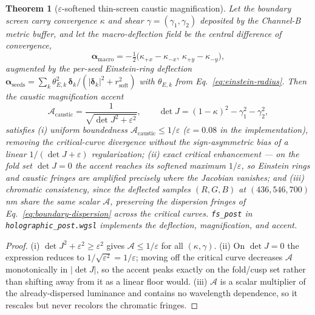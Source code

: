 \documentclass[11pt,letterpaper]{article}
\theoremstyle{plain}
\newtheorem{theorem}{Theorem}
\DeclareRobustCommand{\pyvar}[1]{%
  \ifmmode\text{\nolinkurl{#1}}\else\nolinkurl{#1}\fi%
}
\begin{document}
\begin{theorem}[$\varepsilon$-softened thin-screen caustic magnification]
\label{thm:caustic_eps_soft}
Let the boundary screen carry convergence $\kappa$ and shear
$\gamma=(\gamma_{1},\gamma_{2})$ deposited by the Channel-B metric
buffer, and let the macro-deflection field be the central difference
of convergence,
\begin{equation}
\boldsymbol{\alpha}_{\mathrm{macro}}
  = -\tfrac12\bigl(\kappa_{+x}-\kappa_{-x},\,
                   \kappa_{+y}-\kappa_{-y}\bigr),
\end{equation}
augmented by the per-seed Einstein-ring deflection
$\boldsymbol{\alpha}_{\mathrm{seeds}}
 =\sum_{k}\theta_{E,k}^{2}\,\boldsymbol{\delta}_{k}/
   (|\boldsymbol{\delta}_{k}|^{2}+r_{\mathrm{soft}}^{2})$ with
$\theta_{E,k}$ from Eq.~\eqref{eq:einstein-radius}. Then the caustic
magnification accent
\begin{equation}
\mathcal{A}_{\mathrm{caustic}}
  = \frac{1}{\sqrt{\det J^{2} + \varepsilon^{2}}},
\qquad
\det J = (1-\kappa)^{2} - \gamma_{1}^{2} - \gamma_{2}^{2},
\end{equation}
satisfies (i) uniform boundedness
$\mathcal{A}_{\mathrm{caustic}} \le 1/\varepsilon$
($\varepsilon = 0.08$ in the implementation), removing the
critical-curve divergence without the sign-asymmetric bias of a linear
$1/(\det J+\varepsilon)$ regularization; (ii) exact critical
enhancement --- on the fold set $\det J=0$ the accent reaches its
softened maximum $1/\varepsilon$, so Einstein rings and caustic
fringes are amplified precisely where the Jacobian vanishes; and
(iii) chromatic consistency, since the deflected samples
$(R,G,B)$ at $(436,546,700)$ nm share the same scalar $\mathcal{A}$,
preserving the dispersion fringes of
Eq.~\eqref{eq:boundary-dispersion} across the critical curves.
\pyvar{fs\_post} in \pyvar{holographic\_post.wgsl} implements the
deflection, magnification, and accent.
\end{theorem}

\begin{proof}
(i) $\det J^{2}+\varepsilon^{2}\ge\varepsilon^{2}$ gives
$\mathcal{A}\le1/\varepsilon$ for all $(\kappa,\gamma)$. (ii) On
$\det J=0$ the expression reduces to $1/\sqrt{\varepsilon^{2}}
=1/\varepsilon$; moving off the critical curve decreases
$\mathcal{A}$ monotonically in $|\det J|$, so the accent peaks
exactly on the fold/cusp set rather than shifting away from it as a
linear floor would. (iii) $\mathcal{A}$ is a scalar multiplier of the
already-dispersed luminance and contains no wavelength dependence,
so it rescales but never recolors the chromatic fringes.
\end{proof}
\end{document}
